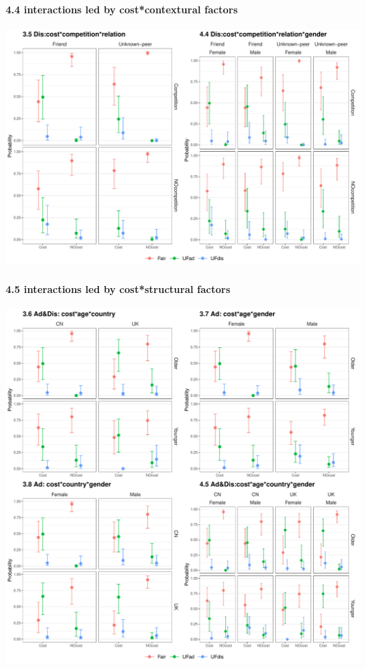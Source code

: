 \documentclass[
]{article}
\begin{document}
\hypertarget{interactions-led-by-costcontextural-factors}{%
\paragraph{4.4 interactions led by cost*contextural
factors}\label{interactions-led-by-costcontextural-factors}}

\includegraphics{Registration_The-Dynamic-Cost-Model_files/figure-latex/plot 4.4-1.pdf}

\hypertarget{interactions-led-by-coststructural-factors}{%
\paragraph{4.5 interactions led by cost*structural
factors}\label{interactions-led-by-coststructural-factors}}

\includegraphics{Registration_The-Dynamic-Cost-Model_files/figure-latex/plot 4.5-1.pdf}
\end{document}
